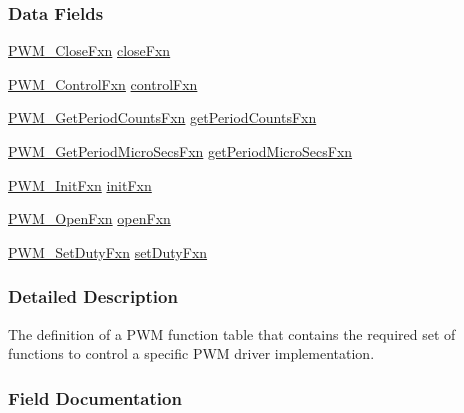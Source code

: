 \subsubsection*{Data Fields}
\begin{DoxyCompactItemize}
\item 
\hyperlink{_p_w_m_8h_a1643d365dfa900197b324ea74035d2ec}{P\+W\+M\+\_\+\+Close\+Fxn} \hyperlink{struct_p_w_m___fxn_table_a1d6e6575c66ae470f23dc2f40e54706c}{close\+Fxn}
\item 
\hyperlink{_p_w_m_8h_af538c912f876c434c62e7e0e28d41b75}{P\+W\+M\+\_\+\+Control\+Fxn} \hyperlink{struct_p_w_m___fxn_table_af96cd80b3f63291664e9268cd7a30cbc}{control\+Fxn}
\item 
\hyperlink{_p_w_m_8h_a4ac091a98716ff54c33b0d300a2a7fee}{P\+W\+M\+\_\+\+Get\+Period\+Counts\+Fxn} \hyperlink{struct_p_w_m___fxn_table_a5cbb6714cf9cd77a27c10fcd16c79da9}{get\+Period\+Counts\+Fxn}
\item 
\hyperlink{_p_w_m_8h_a4eb84d54d5b3a05e6ae9d8a580a48b45}{P\+W\+M\+\_\+\+Get\+Period\+Micro\+Secs\+Fxn} \hyperlink{struct_p_w_m___fxn_table_a232b1047381c21969af72160bebf329c}{get\+Period\+Micro\+Secs\+Fxn}
\item 
\hyperlink{_p_w_m_8h_a38666ae4b117b81d35758258012b251a}{P\+W\+M\+\_\+\+Init\+Fxn} \hyperlink{struct_p_w_m___fxn_table_aebcde91c512c962f100d13f511789254}{init\+Fxn}
\item 
\hyperlink{_p_w_m_8h_a16b7b446398f8b90e4fa287c6e4a0981}{P\+W\+M\+\_\+\+Open\+Fxn} \hyperlink{struct_p_w_m___fxn_table_aca1bd99df949b2e0121ff90598279441}{open\+Fxn}
\item 
\hyperlink{_p_w_m_8h_a4d729a443944bea99ae30cb09a0035ee}{P\+W\+M\+\_\+\+Set\+Duty\+Fxn} \hyperlink{struct_p_w_m___fxn_table_a766700e0a02097f9fd2d332b71082605}{set\+Duty\+Fxn}
\end{DoxyCompactItemize}


\subsubsection{Detailed Description}
The definition of a P\+W\+M function table that contains the required set of functions to control a specific P\+W\+M driver implementation. 

\subsubsection{Field Documentation}
